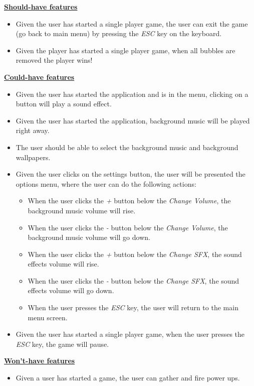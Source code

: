 \documentclass[a4paper,11pt]{article}
\begin{document}
\noindent
\textbf{\underline{Should-have features}}
\begin{itemize}
   \item Given the user has started a single player game,
         the user can exit the game (go back to main menu) by pressing
         the \textit{ESC} key on the keyboard.
   \item Given the player has started a single player game,
         when all bubbles are removed the player wins!
\end{itemize}
\noindent 
\textbf{\underline{Could-have features}}
\begin{itemize}
  \item Given the user has started the application and is in the menu,
  		clicking on a button will play a sound effect.
  \item Given the user has started the application,
  		background music will be played right away.
  \item	The user should be able to select the background music and background wallpapers.
  \item Given the user clicks on the settings button,
		the user will be presented the options menu,
		where the user can do the following actions:
  \begin{itemize}
    \item When the user clicks the \textit{+} button below the \textit{Change Volume},
          the background music volume will rise.
    \item When the user clicks the \textit{-} button below the \textit{Change Volume},
          the background music volume will go down.
    \item When the user clicks the \textit{+} button below the \textit{Change SFX},
          the sound effects volume will rise.
    \item When the user clicks the \textit{-} button below the \textit{Change SFX},
          the sound effects volume will go down.
    \item When the user presses the \textit{ESC} key, 
          the user will return to the main menu screen.
  \end{itemize}
  \item Given the user has started a single player game,
        when the user presses the \textit{ESC} key, the game will pause.
\end{itemize}

\noindent
\textbf{\underline{Won't-have features}}
\begin{itemize}
  \item Given a user has started a game, the user can gather and fire power ups.
\end{itemize}
\end{document}
